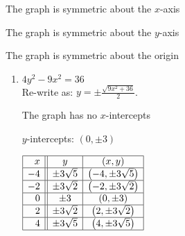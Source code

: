 \begin{multicols}{2}
\begin{enumerate}
\begin{flushleft}
\smallskip

The graph is symmetric about the $x$-axis \smallskip

The graph is symmetric about the $y$-axis \smallskip

The graph is symmetric about the origin 

\end{flushleft}

\setcounter{HW}{\value{enumi}}
\end{enumerate}
\end{multicols}

\pagebreak

\begin{multicols}{2}
\begin{enumerate}
\setcounter{enumi}{\value{HW}}


\item $4y^2-9x^2 = 36$ \\

Re-write as: $y = \pm \frac{\sqrt{9x^2+36}}{2}$.

\begin{flushleft}

The graph has no $x$-intercepts \smallskip

$y$-intercepts:  $(0, \pm 3)$ \smallskip

$\begin{array}{|r||c|c|} 

\hline
 x &   y & (x,y) \\ \hline
-4 & \pm 3 \sqrt{5} &  \left(-4,\pm 3 \sqrt{5}\right) \\  \hline
-2 & \pm 3 \sqrt{2} & \left(-2,\pm 3 \sqrt{2}\right) \\ \hline
0 &  \pm 3 & (0, \pm 3) \\ \hline
2 & \pm 3 \sqrt{2} & \left(2,\pm 3 \sqrt{2}\right) \\ \hline
4 & \pm 3 \sqrt{5} &  \left(4,\pm 3 \sqrt{5}\right) \\  \hline
 
 
\end{array}$ \smallskip



\end{flushleft}
\end{enumerate}
\end{multicols}
